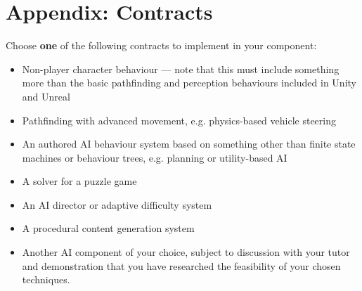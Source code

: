 \documentclass{../../fal_assignment}
\begin{document}
\section*{Appendix: Contracts}

Choose \textbf{one} of the following contracts to implement in your component:

\begin{itemize}
    \item Non-player character behaviour --- note that this must include something more than the basic pathfinding and perception behaviours included in Unity and Unreal
    \item Pathfinding with advanced movement, e.g. physics-based vehicle steering
    \item An authored AI behaviour system based on something other than finite state machines or behaviour trees, e.g. planning or utility-based AI
    \item A solver for a puzzle game
    \item An AI director or adaptive difficulty system
    \item A procedural content generation system
    \item Another AI component of your choice,
        subject to discussion with your tutor
        and demonstration that you have researched the feasibility of your chosen techniques.
\end{itemize}
\end{document}
